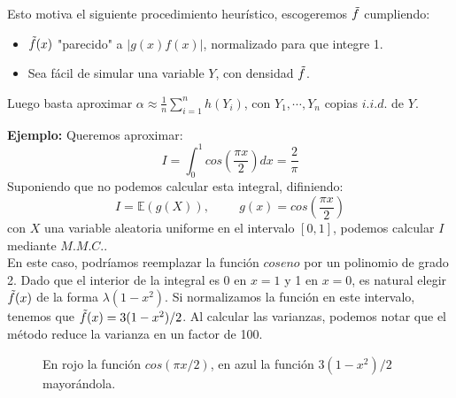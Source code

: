 \documentclass[a4paper]{article}
\numberwithin{equation}{subsection}
\numberwithin{definicion}{subsection}
\def\E{\mathbb E}
\begin{document}
Esto motiva el siguiente procedimiento heurístico, escogeremos $\Tilde{f}$ cumpliendo:
\begin{itemize}
    \item $\Tilde{f}(x)$ "parecido" a $|g(x)f(x)|$, normalizado para que integre 1.
    \item Sea fácil de simular una variable $Y$, con densidad $\Tilde{f}$.
\end{itemize}
Luego basta aproximar $\alpha \approx \frac{1}{n}\sum_{i=1}^n h(Y_i)$, con $Y_1,\cdots,Y_n$ copias $i.i.d.$ de $Y$.\\ \newline

\textbf{Ejemplo: }Queremos aproximar:
\[I = \int_{0}^1 cos\left(\frac{\pi x}{2}\right)dx = \frac{2}{\pi}\]
Suponiendo que no podemos calcular esta integral, difiniendo:
\[I = \E(g(X)),\hspace{1cm}g(x) = cos\left(\frac{\pi x}{2}\right)\]
con $X$ una variable aleatoria uniforme en el intervalo $[0,1]$, podemos calcular $I$ mediante $M.M.C.$.\\ \newline
En este caso, podríamos reemplazar la función $coseno$ por un polinomio de grado 2. Dado que el interior de la integral es 0 en $x=1$ y 1 en $x=0$, es natural elegir $\Tilde{f}(x)$ de la forma $\lambda(1-x^2)$. Si normalizamos la función en este intervalo, tenemos que $\Tilde{f}(x) = 3(1-x^2)/2$. Al calcular las varianzas, podemos notar que el método reduce la varianza en un factor de 100. \\
\newpage

\begin{figure}[h!]
    \centering
    \caption{En rojo la función $cos(\pi x/2)$, en azul la función $3(1-x^2)/2$ mayorándola.}
\end{figure}\\
\end{document}
